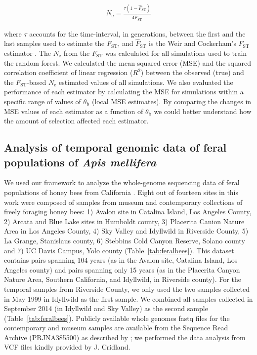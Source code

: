 \documentclass[a4paper, 12pt]{article}
\begin{document}
\begin{gather*}
\hat N_\mathrm{e} = \frac{\tau(1-\hat F_\mathrm{ST})}{4\hat F_\mathrm{ST} } 
\end{gather*}

\noindent where $\tau$ accounts for the time-interval, in generations, between the first and the last samples used to estimate the $F_\mathrm{ST}$, and $\hat F_\mathrm{ST}$ is the Weir and Cockerham's $F_\mathrm{ST}$ estimator \citep{Weir:1984dx}. The $N_\mathrm{e}$ from the $F_\mathrm{ST}$ was calculated for all simulations used to train the random forest. We calculated the mean squared error (MSE) and the squared correlation coefficient of linear regression ($R^2$) between the observed (true) and the $F_\mathrm{ST}$-based $N_\mathrm{e}$ estimated values of all simulations. We also evaluated the performance of each estimator by calculating the MSE for simulations within a specific range of values of $\theta_\mathrm{b}$ (local MSE estimates). By comparing the changes in MSE values of each estimator as a function of $\theta_\mathrm{b}$ we could better understand how the amount of selection affected each estimator.

\subsection*{Analysis of temporal genomic data of feral populations of \textit{Apis mellifera}} 

We used our framework to analyze the whole-genome sequencing data of feral populations of honey bees from California \citep{Cridland:2018fx}. Eight out of fourteen sites in this work were composed of samples from museum and contemporary collections of freely foraging honey bees: 1) Avalon site in Catalina Island, Los Angeles County, 2) Arcata and Blue Lake sites in Humboldt county, 3) Placerita Canion Nature Area in Los Angeles County, 4) Sky Valley and Idyllwild in Riverside County, 5) La Grange, Stanislaus county, 6) Stebbins Cold Canyon Reserve, Solano county and 7) UC Davis Campus, Yolo county (Table~\ref{tab:feralbees}). This dataset contains pairs spanning 104 years (as in the Avalon site, Catalina Island, Los Angeles county) and pairs spanning only 15 years (as in the Placerita Canyon Nature Area, Southern California, and Idyllwild, in Riverside county). For the temporal samples from Riverside County, we only used the two samples collected in May 1999 in Idyllwild as the first sample. We combined all samples collected in September 2014 (in Idyllwild and Sky Valley) as the second sample (Table~\ref{tab:feralbees}). Publicly available whole genomes fastq files for the contemporary and museum samples are available from the Sequence Read Archive (PRJNA385500) as described by \citet{Cridland:2018fx}; we performed the data analysis from VCF files \citep[the same files used in][]{Cridland:2018fx} kindly provided by J. Cridland.
\end{document}
